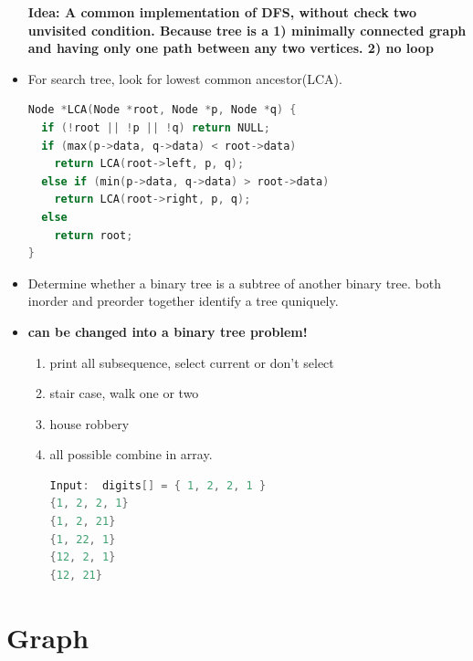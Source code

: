 \documentclass[a4paper,11pt,twoside]{book}
\begin{document}
\begin{itemize}
\textbf{Idea: A common implementation of DFS, without check two unvisited condition. Because tree is a 1) minimally connected graph and having only one path between any two vertices. 2) no loop}

\item For search tree, look for lowest common ancestor(LCA). 
\begin{lstlisting}[frame=single, language=c++]
Node *LCA(Node *root, Node *p, Node *q) {
  if (!root || !p || !q) return NULL;
  if (max(p->data, q->data) < root->data)
    return LCA(root->left, p, q);
  else if (min(p->data, q->data) > root->data)
    return LCA(root->right, p, q);
  else
    return root;
}

\end{lstlisting}

\item Determine whether a binary tree is a subtree of another binary tree. both inorder and preorder together identify a tree quniquely.

\item \textbf{can be changed into a binary tree problem!}
\begin{enumerate}
	\item print all subsequence, select current or don't select
	\item stair case, walk one or two
	\item house robbery
	\item all possible combine in array. 
	
\begin{lstlisting}[frame=single, language=c++]	
Input:  digits[] = { 1, 2, 2, 1 }	
{1, 2, 2, 1} 
{1, 2, 21} 
{1, 22, 1} 
{12, 2, 1} 
{12, 21} 
\end{lstlisting}
\end{enumerate}

\end{itemize}

\section{Graph}
\end{document}
